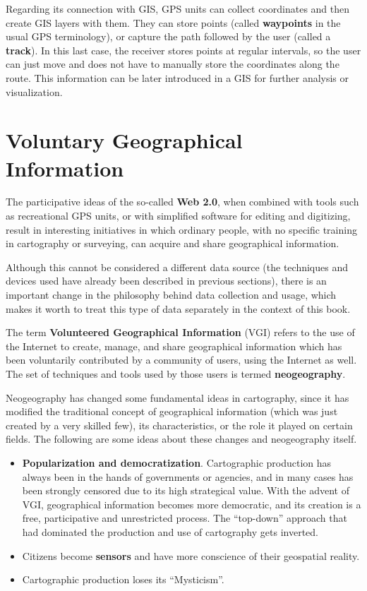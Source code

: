 Regarding its connection with GIS, GPS units can collect coordinates and then create GIS layers with them. They can store points (called \textbf{waypoints} in the usual GPS terminology), or capture the path followed by the user (called a \textbf{track}). In this last case, the receiver stores points at regular intervals, so the user can just move and does not have to manually store the coordinates along the route. This information can be later introduced in a GIS for further analysis or visualization. 


\section{Voluntary Geographical Information}

The participative ideas of the so-called \textbf{Web 2.0}, when combined with tools such as recreational GPS units, or with simplified software for editing and digitizing, result in interesting initiatives in which ordinary people, with no specific training in cartography or surveying, can acquire and share geographical information. 

Although this cannot be considered a different data source (the techniques and devices used have already been described in previous sections), there is an important change in the philosophy behind data collection and usage, which makes it worth to treat this type of data separately in the context of this book.

The term \textbf{Volunteered Geographical Information} (VGI) refers to the use of the Internet to create, manage, and share geographical information which has been voluntarily contributed by a community of users, using the Internet as well. The set of techniques and tools used by those users is termed \textbf{neogeography}. 

Neogeography has changed some fundamental ideas in cartography, since it has modified the traditional concept of geographical information (which was just created by a very skilled few), its characteristics, or the role it played on certain fields. The following are some ideas about these changes and neogeography itself.


\begin{itemize}
	\item \textbf{Popularization and democratization}. Cartographic production has always been in the hands of governments or agencies, and in many cases has been strongly censored due to its high strategical value. With the advent of VGI, geographical information becomes more democratic, and its creation is a free, participative and unrestricted process. The ``top-down'' approach that had dominated the production and use of cartography gets inverted.
	\item Citizens become \textbf{sensors} and have more conscience of their geospatial reality.
	\item Cartographic production loses its ``Mysticism''.	
\end{itemize}

